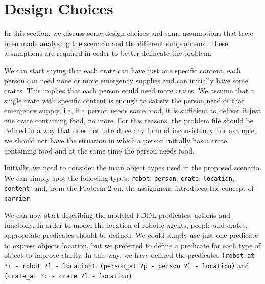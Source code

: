 
\section{Design Choices}
\label{sec3}

In this section, we discuss some design choices and some assumptions that have been made 
analyzing the scenario and the different subproblems. These assumptions are required 
in order to better delineate the problem.

We can start saying that each crate can have just one specific content, each person can need none or 
more emergency supplies and can initially have some crates. This implies that each person could need 
more crates.
We assume that a single crate with specific content is enough to satisfy the person need of that emergency 
supply, i.e. if a person needs some food, it is sufficient to deliver it just one crate containing food, no more. 
For this reasons, the problem file should be defined in a way that does not introduce any form of inconsistency:
for example, we should not have the situation in which a person initially has a crate containing food and at 
the same time the person needs food.



Initially, we need to consider the main object types used in the proposed scenario.
We can simply spot the following types: \texttt{robot}, \texttt{person}, \texttt{crate}, \texttt{location}, 
\texttt{content}, and, from the Problem 2 on, the assignment introduces the concept of \texttt{carrier}.

We can now start describing the modeled PDDL predicates, actions and functions.
In order to model the location of robotic agents, people and crates, appropriate predicates should be defined.
We could simply use just one predicate to express objects location, but we preferred to define a predicate for 
each type of object to improve clarity. In this way, we have defined the predicates 
\texttt{(robot\_at ?r - robot ?l - location)}, \texttt{(person\_at ?p - person ?l - location)} and 
\texttt{(crate\_at ?c - crate ?l - location)}.




